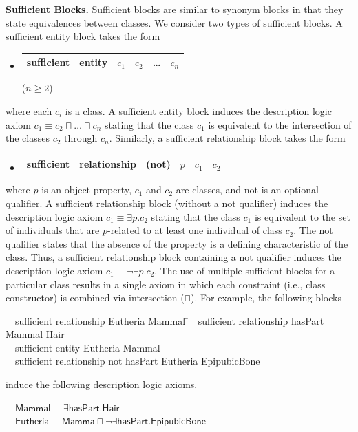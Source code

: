 \documentclass[5p,authoryear]{elsarticle}
\newcommand{\myblock}[1]{\vspace{12pt}\noindent\textbf{#1}}
\begin{document}
\myblock{Sufficient Blocks.} Sufficient blocks are similar to synonym
blocks in that they state equivalences between classes. We consider
two types of sufficient blocks. A sufficient entity block takes the
form
\begin{itemize}
\item[]
  \begin{tabular}{|l|l|l|l|l|l|}\hline \textsf{sufficient} & \textsf{entity} & $c_1$ & $c_2$ & \dots & $c_n$
\\ \hline
\end{tabular} \hfill ($n \ge 2$)
\end{itemize}
where each $c_i$ is a class. A sufficient entity block induces the
description logic axiom $c_1 \equiv c_2 \sqcap \dots \sqcap c_n$
stating that the class $c_1$ is equivalent to the intersection of the
classes $c_2$ through $c_n$.  Similarly, a sufficient relationship
block takes the form
\begin{itemize}
\item[]
  \begin{tabular}{|l|l|l|l|l|l|l|l|}\hline \textsf{sufficient} & \textsf{relationship} & (\textsf{not}) & $p$ & $c_1$ & $c_2$ \\ 
\hline \end{tabular} 
\end{itemize} 
where $p$ is an object property, $c_1$ and $c_2$ are classes, and
\textsf{not} is an optional qualifier.  A sufficient relationship
block (without a \textsf{not} qualifier) induces the description logic
axiom $c_1 \equiv \exists p . c_2$ stating that the class $c_1$ is
equivalent to the set of individuals that are $p$-related to at least
one individual of class $c_2$. The \textsf{not} qualifier states that
the absence of the property is a defining characteristic of the
class. Thus, a sufficient relationship block containing a \textsf{not}
qualifier induces the description logic axiom $c_1 \equiv \neg \exists
p . c_2$.  The use of multiple sufficient blocks for a particular
class results in a single axiom in which each constraint (i.e., class
constructor) is combined via intersection ($\sqcap$). For example, the
following blocks
\begin{small}
\begin{tabbing}
~~\textsf{sufficient} \= \textsf{relationship} \= \textsf{Eutheria} \=
  \textsf{Mammal} \= \kill ~~\textsf{sufficient} \>
  \textsf{relationship} \> \textsf{hasPart} \> \textsf{Mammal} \>
  \textsf{Hair} \\ ~~\textsf{sufficient} \> \textsf{entity} \>
  \textsf{Eutheria} \> \textsf{Mammal} \\ ~~\textsf{sufficient} \>
  \textsf{relationship} \> \textsf{not} \> \textsf{hasPart} \>
  \textsf{Eutheria} \textsf{EpipubicBone}
\end{tabbing}
induce the following description logic axioms.
\begin{tabbing}
~~$\textsf{Mammal} \equiv \exists \textsf{hasPart}.\textsf{Hair}$\\ 
~~$\textsf{Eutheria} \equiv \textsf{Mamma} \sqcap \neg \exists \textsf{hasPart} . \textsf{EpipubicBone}$
\end{tabbing}
\end{small}
\end{document}
